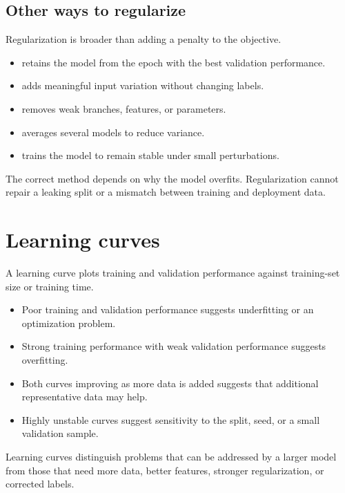 \subsection{Other ways to regularize}

Regularization is broader than adding a penalty to the objective.

\begin{itemize}
  \item {} retains the model from the epoch with the best validation performance.
  \item {} adds meaningful input variation without changing labels.
    \item {} removes weak branches, features, or parameters.
  \item {} averages several models to reduce variance.
  \item {} trains the model to remain stable under small perturbations.
\end{itemize}

The correct method depends on why the model overfits. Regularization cannot repair a leaking split or a mismatch between training and deployment data.

\section{Learning curves}

A learning curve plots training and validation performance against training-set size or training time.

\begin{itemize}
  \item Poor training and validation performance suggests underfitting or an optimization problem.
  \item Strong training performance with weak validation performance suggests overfitting.
  \item Both curves improving as more data is added suggests that additional representative data may help.
  \item Highly unstable curves suggest sensitivity to the split, seed, or a small validation sample.
\end{itemize}

Learning curves distinguish problems that can be addressed by a larger model from those that need more data, better features, stronger regularization, or corrected labels.

